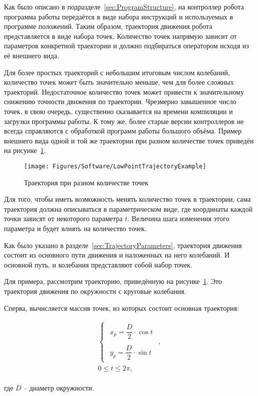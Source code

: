 Как было описано в подразделе~\ref{sec:ProgramStructure}, на контроллер робота программа работы передаётся в виде набора инструкций и используемых в программе положений.
Таким образом, траектория движения робота представляется в виде набора точек.
Количество точек напрямую зависит от параметров конкретной траектории и должно подбираться оператором исходя из её внешнего вида.

Для более простых траекторий с небольшим итоговым числом колебаний, количество точек может быть значительно меньше, чем для более сложных траекторий.
Недостаточное количество точек может привести к значительному снижению точности движения по траектории.
Чрезмерно завышенное число точек, в свою очередь, существенно сказывается на времени компиляции и загрузки программы работы.
К тому же, более старые версии контроллеров не всегда справляются с обработкой программ работы большого объёма.
Пример внешнего вида одной и той же траектории при разном количестве точек приведён на рисунке~\ref{fig:LowPointTrajectoryExample}.

\begin{figure}[H]
    \centering
    \vspace{14pt}
    \texttt{[image: Figures/Software/LowPointTrajectoryExample]}
    \caption{Траектория при разном количестве точек}
    \label{fig:LowPointTrajectoryExample}
\end{figure}

Для того, чтобы иметь возможность менять количество точек в траектории, сама траектория должна описываться в параметрическом виде, где координаты каждой точки зависят от некоторого параметра $t$.
Величина шага изменения этого параметра и будет влиять на количество точек.

Как было указано в разделе~\ref{sec:TrajectoryParameters}, траектория движения состоит из основного пути движения и наложенных на него колебаний.
И основной путь, и колебания представляют собой набор точек.

Для примера, рассмотрим траекторию, приведённую на рисунке~\ref{fig:LowPointTrajectoryExample}.
Это траектория движения по окружности с круговые колебания.

Сперва, вычисляется массив точек, из которых состоит основная траектория:

\begin{gather*}
    \begin{cases}
        \begin{aligned}
            x_p = \dfrac{D}{2} \cdot \cos t \\
            \\
            y_p = \dfrac{D}{2} \cdot \sin t
        \end{aligned}
    \end{cases}, \\
    0 \leq t \leq 2 \pi,
\end{gather*} \\
где $D$ -- диаметр окружности.

